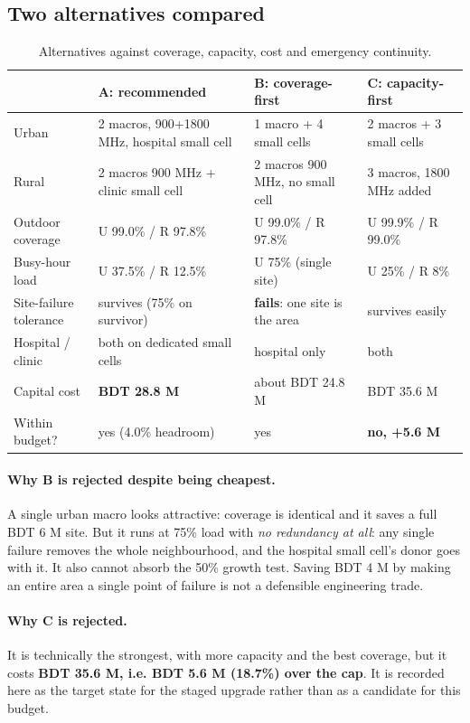 \documentclass[9pt,a4paper]{article}
\begin{document}
\subsection{Two alternatives compared}
\begin{table}[H]\centering\small
\caption{Alternatives against coverage, capacity, cost and emergency continuity.}
\begin{tabularx}{\textwidth}{@{}p{2.9cm}XXX@{}}
\toprule
& \textbf{A: recommended} & \textbf{B: coverage-first} & \textbf{C: capacity-first} \\
\midrule
Urban & 2 macros, 900+1800 MHz, hospital small cell & 1 macro + 4 small cells & 2 macros + 3 small cells \\
Rural & 2 macros 900 MHz + clinic small cell & 2 macros 900 MHz, no small cell & 3 macros, 1800 MHz added \\
Outdoor coverage & U 99.0\% / R 97.8\% & U 99.0\% / R 97.8\% & U 99.9\% / R 99.0\% \\
Busy-hour load & U 37.5\% / R 12.5\% & U 75\% (single site) & U 25\% / R 8\% \\
Site-failure tolerance & survives (75\% on survivor) & \textbf{fails}: one site is the area & survives easily \\
Hospital / clinic & both on dedicated small cells & hospital only & both \\
Capital cost & \textbf{BDT 28.8 M} & about BDT 24.8 M & BDT 35.6 M \\
Within budget? & yes (4.0\% headroom) & yes & \textbf{no, +5.6 M} \\
\bottomrule
\end{tabularx}
\end{table}

\paragraph{Why B is rejected despite being cheapest.} A single urban macro looks attractive:
coverage is identical and it saves a full BDT 6 M site. But it runs at 75\% load with \emph{no
redundancy at all}: any single failure removes the whole neighbourhood, and the hospital small
cell's donor goes with it. It also cannot absorb the 50\% growth test. Saving BDT 4 M by making an
entire area a single point of failure is not a defensible engineering trade.

\paragraph{Why C is rejected.} It is technically the strongest, with more capacity and the best
coverage, but it costs \textbf{BDT 35.6 M, i.e. BDT 5.6 M (18.7\%) over the cap}. It is recorded
here as the target state for the staged upgrade rather than as a candidate for this budget.
\end{document}
